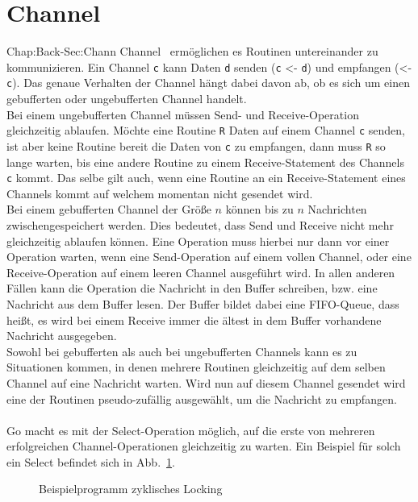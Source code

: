 \section{Channel}{Chap:Back-Sec:Chann}
Channel~\cite{channel-spec} ermöglichen es Routinen untereinander zu 
kommunizieren.
Ein Channel \texttt{c} kann Daten \texttt{d} senden (\texttt{c} <- \texttt{d})
und empfangen (<- \texttt{c}). Das genaue Verhalten der Channel hängt dabei 
davon ab, ob es sich um einen gebufferten oder ungebufferten Channel handelt. \\
Bei einem ungebufferten Channel müssen Send- und Receive-Operation gleichzeitig 
ablaufen. Möchte eine Routine \texttt{R} Daten auf einem Channel \texttt{c} senden, 
ist aber keine Routine bereit die Daten von \texttt{c} zu empfangen, 
dann muss \texttt{R} so lange warten, bis eine andere Routine zu einem 
Receive-Statement des Channels \texttt{c} kommt. Das selbe gilt auch, wenn 
eine Routine an ein Receive-Statement eines Channels kommt auf welchem 
momentan nicht gesendet wird.\\
Bei einem gebufferten Channel der Größe $n$ können bis zu $n$ Nachrichten
zwischengespeichert werden. Dies bedeutet, dass Send und Receive nicht mehr 
gleichzeitig ablaufen können. Eine Operation muss hierbei nur dann 
vor einer Operation warten, wenn eine Send-Operation auf einem vollen 
Channel, oder eine Receive-Operation auf einem leeren Channel ausgeführt 
wird. In allen anderen Fällen kann die Operation die Nachricht in den Buffer 
schreiben, bzw. eine Nachricht aus dem Buffer lesen. Der Buffer bildet dabei 
eine FIFO-Queue, dass heißt, es wird bei einem Receive immer die ältest in dem
Buffer vorhandene Nachricht ausgegeben.\\
Sowohl bei gebufferten als auch bei ungebufferten Channels kann es zu 
Situationen kommen, in denen mehrere Routinen gleichzeitig auf dem selben 
Channel auf eine Nachricht warten. Wird nun auf diesem Channel gesendet 
wird eine der Routinen pseudo-zufällig ausgewählt, um die Nachricht zu empfangen.\\\\
Go macht es mit der Select-Operation möglich, auf die erste von mehreren 
erfolgreichen Channel-Operationen gleichzeitig zu warten. Ein Beispiel für solch 
ein Select befindet sich in Abb.~\ref{Chan:Analyze-Sec:Channel-Fig:SelectEx}.
\begin{figure}[h!]
  
  \caption{Beispielprogramm zyklisches Locking}
  \label{Chan:Analyze-Sec:Channel-Fig:SelectEx}
\end{figure}
